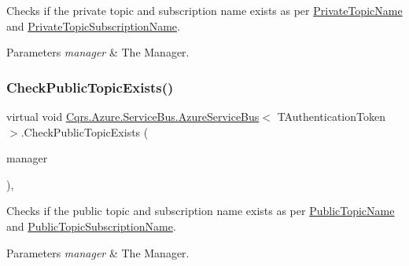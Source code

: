 Checks if the private topic and subscription name exists as per \hyperlink{classCqrs_1_1Azure_1_1ServiceBus_1_1AzureServiceBus_a7af8ebcdd25672ff2252085637904f82_a7af8ebcdd25672ff2252085637904f82}{Private\+Topic\+Name} and \hyperlink{classCqrs_1_1Azure_1_1ServiceBus_1_1AzureServiceBus_a22498d51bba26c801b3b553fb451a6ae_a22498d51bba26c801b3b553fb451a6ae}{Private\+Topic\+Subscription\+Name}. 


\begin{DoxyParams}{Parameters}
{\em manager} & The Manager.\\
\hline
\end{DoxyParams}
\mbox{\label{classCqrs_1_1Azure_1_1ServiceBus_1_1AzureServiceBus_a4938623573b2aa81b295a247cb76c9ff_a4938623573b2aa81b295a247cb76c9ff}} 
\subsubsection{\texorpdfstring{Check\+Public\+Topic\+Exists()}{CheckPublicTopicExists()}}
{\footnotesize\ttfamily virtual void \hyperlink{classCqrs_1_1Azure_1_1ServiceBus_1_1AzureServiceBus}{Cqrs.\+Azure.\+Service\+Bus.\+Azure\+Service\+Bus}$<$ T\+Authentication\+Token $>$.Check\+Public\+Topic\+Exists (\begin{DoxyParamCaption}\item[{Manager}]{manager }\end{DoxyParamCaption})\hspace{0.3cm}{\ttfamily [protected]}, {\ttfamily [virtual]}}



Checks if the public topic and subscription name exists as per \hyperlink{classCqrs_1_1Azure_1_1ServiceBus_1_1AzureServiceBus_ac6f4fbafebcde04a8493462b688e0abe_ac6f4fbafebcde04a8493462b688e0abe}{Public\+Topic\+Name} and \hyperlink{classCqrs_1_1Azure_1_1ServiceBus_1_1AzureServiceBus_adab1b2f0dc9f199d5f0aa60d57ba71c8_adab1b2f0dc9f199d5f0aa60d57ba71c8}{Public\+Topic\+Subscription\+Name}. 


\begin{DoxyParams}{Parameters}
{\em manager} & The Manager.\\
\hline
\end{DoxyParams}
\mbox{\label{classCqrs_1_1Azure_1_1ServiceBus_1_1AzureServiceBus_ab7f636dd2b5009f1a58a530c47f2536a_ab7f636dd2b5009f1a58a530c47f2536a}} 
